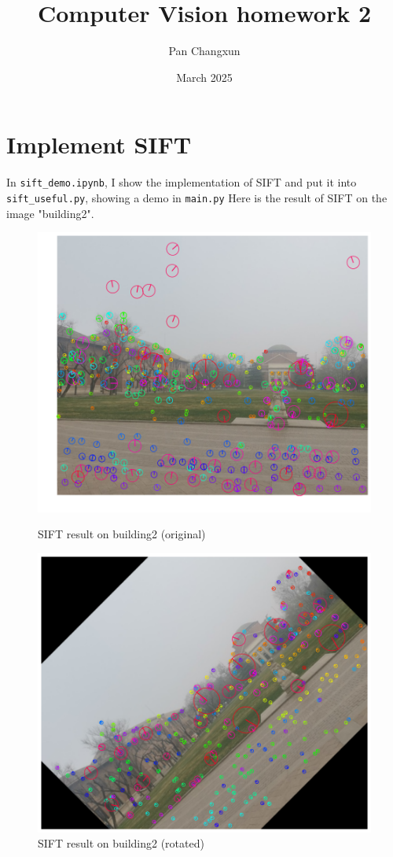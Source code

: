 \documentclass[]{article}
\title{Computer Vision homework 2}
\author{Pan Changxun}
\date{March 2025}
\begin{document}
\maketitle

\section{Implement SIFT}
In \verb|sift_demo.ipynb|, I show the implementation of SIFT and put it into \verb|sift_useful.py|, showing a demo in \verb|main.py|
Here is the result of SIFT on the image "building2".
\begin{figure}[h]
	\centering
	\begin{minipage}{0.48\textwidth}
		\centering
		\includegraphics[width=\textwidth]{detect_building.png}
		\caption{SIFT result on building2 (original)}
		\label{fig:sift_result}
	\end{minipage}
	\hfill
	\begin{minipage}{0.48\textwidth}
		\centering
		\includegraphics[width=\textwidth]{detect_rotate_building.png}
		\caption{SIFT result on building2 (rotated)}
		\label{fig:sift_result1}
	\end{minipage}
\end{figure}
\end{document}
